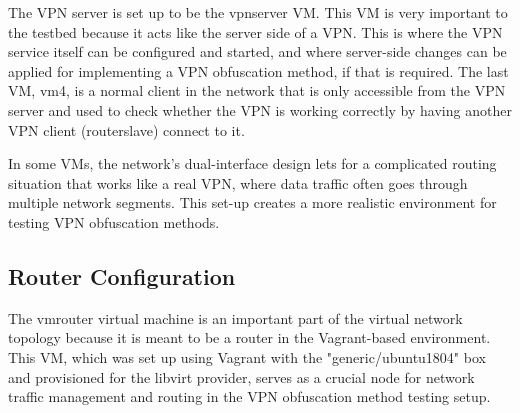 \documentclass[12pt, fleqn, a4paper]{article}
\begin{document}
The VPN server is set up to be the vpnserver VM. This VM is very important to the testbed because it acts like the server side of a VPN. This is where the VPN service itself can be configured and started, and where server-side changes can be applied for implementing a VPN obfuscation method, if that is required. The last VM, vm4, is a normal client in the network that is only accessible from the VPN server and used to check whether the VPN is working correctly by having another VPN client (routerslave) connect to it.

In some VMs, the network's dual-interface design lets for a complicated routing situation that works like a real VPN, where data traffic often goes through multiple network segments. This set-up creates a more realistic environment for testing VPN obfuscation methods.


\subsection{Router Configuration}
The vmrouter virtual machine is an important part of the virtual network topology because it is meant to be a router in the Vagrant-based environment. This VM, which was set up using Vagrant with the "generic/ubuntu1804" box and provisioned for the libvirt provider, serves as a crucial node for network traffic management and routing in the VPN obfuscation method testing setup.
\end{document}
